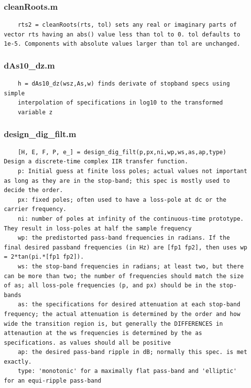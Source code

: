 \documentclass[]{article}
\begin{document}
\subsubsection*{cleanRoots.m}
\begin{lstlisting}
    rts2 = cleanRoots(rts, tol) sets any real or imaginary parts of vector rts having an abs() value less than tol to 0. tol defaults to 1e-5. Components with absolute values larger than tol are unchanged.
\end{lstlisting}

\subsubsection*{dAs10\_dz.m}
\begin{lstlisting}
    h = dAs10_dz(wsz,As,w) finds derivate of stopband specs using simple
    interpolation of specifications in log10 to the transformed
    variable z
\end{lstlisting}

\subsubsection*{design\_dig\_filt.m}
\begin{lstlisting}
    [H, E, F, P, e_] = design_dig_filt(p,px,ni,wp,ws,as,ap,type) Design a discrete-time complex IIR transfer function. 
    p: Initial guess at finite loss poles; actual values not important as long as they are in the stop-band; this spec is mostly used to decide the order.
    px: fixed poles; often used to have a loss-pole at dc or the carrier frequency.
    ni: number of poles at infinity of the continuous-time prototype. They result in loss-poles at half the sample frequency
    wp: the predistorted pass-band frequencies in radians. If the final desired passband frequencies (in Hz) are [fp1 fp2], then uses wp = 2*tan(pi.*[fp1 fp2]).
    ws: the stop-band frequencies in radians; at least two, but there can be more than two; the number of frequencies should match the size of as; all loss-pole frequencies (p, and px) should be in the stop-bands
    as: the specifications for desired attenuation at each stop-band frequency; the actual attenuation is determined by the order and how wide the transition region is, but generally the DIFFERENCES in attenaution at the ws frequencies is determined by the as specifications. as values should all be positive
    ap: the desired pass-band ripple in dB; normally this spec. is met exactly.
    type: 'monotonic' for a maximally flat pass-band and 'elliptic' for an equi-ripple pass-band
\end{lstlisting}
\end{document}
